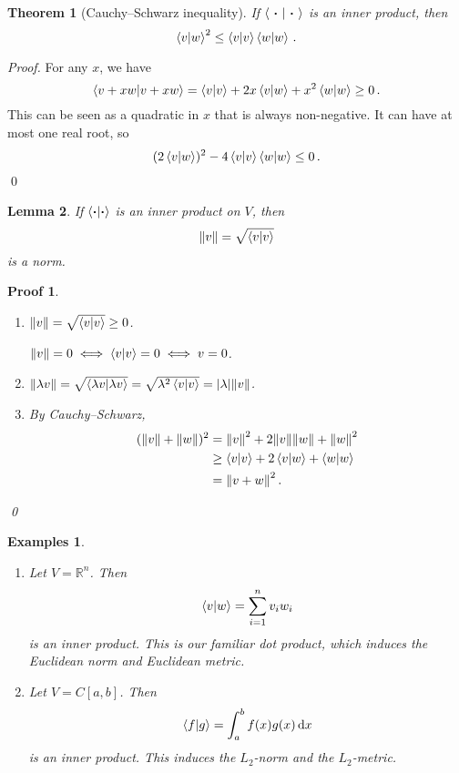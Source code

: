 \documentclass{article}
\theoremstyle{plain}\theoremheaderfont{\normalfont\itshape}\theorembodyfont{\rmfamily}\theoremseparator{.}\newtheorem*{rem}{Remark}\newtheorem*{ex}{Example}\newtheorem*{proof}{Proof}\newtheorem*{altp}{Alternative proof}
\theoremstyle{plain}\theoremheaderfont{\normalfont\bfseries}\theorembodyfont{\rmfamily}\theoremseparator{.}\newtheorem{thm}{Theorem}[section]\newtheorem{lem}[thm]{Lemma}\newtheorem{prop}[thm]{Proposition}\newtheorem*{cor}{Corollary}\newtheorem{defn}[thm]{Definition}\newtheorem{clm}[thm]{Claim}\newtheorem{clminproof}{Claim}
\theoremstyle{break}\theoremheaderfont{\normalfont\itshape}\theorembodyfont{\rmfamily}\theoremseparator{.\medskip}\newtheorem*{proofskip}{Proof}\newtheorem*{exs}{Examples}\newtheorem*{rems}{Remarks}
\theoremstyle{break}\theoremheaderfont{\normalfont\bfseries}\theorembodyfont{\rmfamily}\theoremseparator{.\medskip}\newtheorem{lemskip}[thm]{Lemma}\newtheorem{defnskip}[thm]{Definition}\newtheorem{propskip}[thm]{Proposition}\newtheorem{thmskip}[thm]{Theorem}
\newcommand{\qed}{\hfill\ensuremath{\Box}}
\begin{document}
    \begin{thm}[Cauchy--Schwarz inequality]
        If \(\braket{\ \vdot \ }{\ \vdot\ }\) is an inner product, then
        \[\braket{v}{w}^2\le\braket{v}\braket{w}\,.\]
    \end{thm}
    \begin{proof}
        For any \(x\), we have
        \[\braket{v+xw}{v+xw}=\braket{v}{v}+2x\braket{v}{w}+x^2\braket{w}{w}\ge 0\,.\]
        This can be seen as a quadratic in \(x\) that is always non-negative. It can have at most one real root, so
        \[(2\braket{v}{w})^2-4\braket{v}{v}\braket{w}{w}\le 0\,.\]\qed
    \end{proof}

    \begin{lem}
        If \(\braket{\vdot}{\vdot}\) is an inner product on \(V\), then
        \[\norm{v}=\sqrt{\braket{v}{v}}\]
        is a norm.
    \end{lem}
    \begin{proofskip}
        \begin{enumerate}[label=(\roman*),topsep=0pt]
            \item \(\norm{v}=\sqrt{\braket{v}{v}}\ge 0\).
            
            \(\norm{v}=0\iff\braket{v}{v}=0\iff v=0\).
            \item \(\norm{\lambda v}=\sqrt{\braket{\lambda v}{\lambda v}}=\sqrt{\lambda^2\braket{v}{v}}=\abs{\lambda}\norm{v}\).
            \item By Cauchy--Schwarz,
            \begin{align*}
                (\norm{v}+\norm{w})^2&=\norm{v}^2+2\norm{v}\norm{w}+\norm{w}^2\\
                &\ge\braket{v}{v}+2\braket{v}{w}+\braket{w}{w}\\
                &=\norm{v+w}^2\,.
            \end{align*}
        \end{enumerate}\qed
    \end{proofskip}
    
    \begin{exs}
        \begin{enumerate}[label=(\roman*),topsep=0pt]
            \item Let \(V=\mathbb{R}^n\). Then
            \[\braket{v}{w}=\sum_{i=1}^{n}v_iw_i\]
            is an inner product. This is our familiar \textit{dot product}, which induces the Euclidean norm and Euclidean metric.
            \item Let \(V=C[a,b]\). Then
            \[\braket{f}{g}=\int_{a}^{b}f(x)g(x)\dd{x}\]
            is an inner product. This induces the \(L_2\)-norm and the \(L_2\)-metric.
        \end{enumerate}
    \end{exs}
\end{document}
